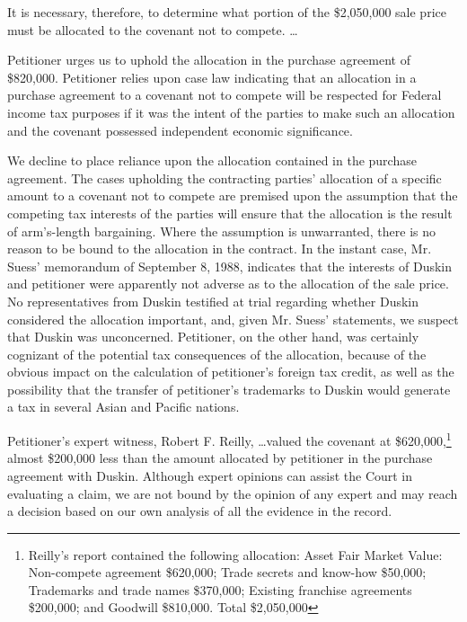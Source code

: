 \begin{select}
It is necessary, therefore, to determine what portion of the \$2,050,000 sale price must be allocated to the covenant not
to compete. \ldots 
 
Petitioner urges us to uphold the allocation in the purchase agreement of \$820,000. Petitioner relies upon case law
indicating that an allocation in a purchase agreement to a covenant not to compete will be respected for Federal income tax
purposes if it was the intent of the parties to make such an allocation and the covenant possessed independent economic
significance. 

We decline to place reliance upon the allocation contained in the purchase agreement. The cases upholding the
contracting parties' allocation of a specific amount to a covenant not to compete are premised upon the assumption that
the competing tax interests of the parties will ensure that the allocation is the result of arm's-length bargaining. Where
the assumption is unwarranted, there is no reason to be bound to the allocation in the contract. In the instant case, Mr. Suess' memorandum of September 8, 1988, indicates that the interests of Duskin and petitioner were apparently not adverse as to the allocation of the sale price. No representatives from Duskin testified at trial regarding whether Duskin considered the allocation important, and, given Mr. Suess' statements,
we suspect that Duskin was unconcerned. Petitioner, on the other hand, was certainly cognizant of the potential tax
consequences of the allocation, because of the obvious impact on the calculation of petitioner's foreign tax credit, as well
as the possibility that the transfer of petitioner's trademarks to Duskin would generate a tax in several Asian and Pacific
nations.

Petitioner's expert witness, Robert F. Reilly, \ldots valued the covenant at \$620,000,\footnote[22]{Reilly's report contained the following allocation:
Asset Fair Market Value: Non-compete agreement \$620,000; Trade secrets and know-how \$50,000; Trademarks and trade names \$370,000; Existing franchise agreements \$200,000; and Goodwill \$810,000. Total \$2,050,000} almost \$200,000 less than the
amount allocated by petitioner in the purchase agreement with Duskin. Although expert opinions can assist the Court in
evaluating a claim, we are not bound by the opinion of any expert and may reach a decision based on our own
analysis of all the evidence in the record. 


\end{select}

